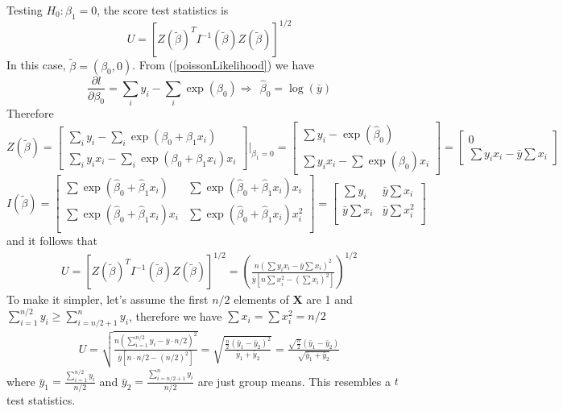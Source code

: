 \documentclass[12pt,oneside]{book}
\begin{document}
Testing $H_0:\beta_1=0$, the score test statistics is 
\[U = [Z(\tilde{\beta})^T I^{-1}(\tilde{\beta}) Z(\tilde{\beta})]^{1/2} \]
In this case, $\tilde{\beta} = (\beta_0, 0)$.   From (\ref{poissonLikelihood}) we have
\[\frac{\partial l}{\partial \beta_0} = \sum_i y_i - \sum_i \exp(\beta_0) \Rightarrow ~~ \hat{\beta}_0 = \log (\bar{y})\] 
Therefore
\[Z(\tilde{\beta}) = \left[
\begin{array}{c}
\sum_i y_i - \sum_i\exp(\beta_0 + \beta_1x_i) \\
\sum_i y_ix_i -\sum_i \exp(\beta_0 + \beta_1x_i)x_i
\end{array}
\right]|_{\beta_1 = 0}
= \left[
\begin{array}{c}
\sum y_i - \exp(\hat{\beta}_0) \\
\sum y_ix_i - \sum\exp(\hat{\beta}_0)x_i 
\end{array}
\right]
= \left[
\begin{array}{c}
0\\
\sum y_ix_i - \bar{y}\sum x_i 
\end{array}
\right]
\]
\[I(\tilde{\beta}) = 
\left[
\begin{array}{cc}
\sum \exp (\hat{\beta}_0 + \hat{\beta}_1 x_i)& \sum \exp (\hat{\beta}_0 + \hat{\beta}_1 x_i)x_i\\
\sum \exp (\hat{\beta}_0 + \hat{\beta}_1 x_i)x_i & \sum \exp (\hat{\beta}_0 + \hat{\beta}_1 x_i)x_i^2  \\
\end{array}\right]
=\left[\begin{array}{cc}
\sum y_i  & \bar{y}\sum x_i \\
\bar{y}\sum x_i  &\bar{y}\sum x_i^2\\
\end{array}\right]
\]
and it follows that 
\begin{align}\label{scoretest1}
U =  [Z(\tilde{\beta})^T I^{-1}(\tilde{\beta}) Z(\tilde{\beta})]^{1/2} =\left( \frac{n(\sum y_ix_i -\bar{y}\sum x_i)^2}{\bar{y}[n\sum x_i^2 -(\sum x_i)^2]}\right)^{1/2}
\end{align}
To make it simpler, let's assume the first $n/2$ elements of $\bm X$ are 1 and $\sum_{i=1}^{n/2}y_i \geq\sum_{i=n/2+1}^n y_i$, therefore we have $\sum x_i =\sum x_i^2=n/2$
\begin{align}\label{scoretest2}
U = \sqrt{\frac{n(\sum_{i=1}^{n/2}y_i-\bar{y}\cdot n/2)^2}{\bar{y}[n\cdot n/2 - (n/2)^2]}} = \sqrt{\frac{\frac{n}{2} (\bar{y}_1-\bar{y}_2)^2}{\bar{y}_1 + \bar{y}_2}} = \frac{\sqrt{\frac{n}{2}}(\bar{y}_1- \bar{y}_2)}{\sqrt{\bar{y}_1 + \bar{y}_2}}
\end{align}
where $\bar{y}_1 = \frac{\sum_{i=1}^{n/2}y_i }{n/2}$ and $\bar{y}_2 = \frac{\sum_{i=n/2 +1}^{n}y_i}{n/2}$ are just group means. This resembles a $t$ test statistics.
\end{document}
